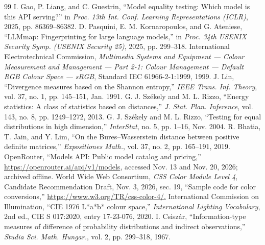 \begin{thebibliography}{99}
 I. Gao, P. Liang, and C. Guestrin, ``Model equality testing: Which model is this API serving?'' in \emph{Proc. 13th Int. Conf. Learning Representations (ICLR)}, 2025, pp. 86369--86382.
 D. Pasquini, E. M. Kornaropoulos, and G. Ateniese, ``LLMmap: Fingerprinting for large language models,'' in \emph{Proc. 34th USENIX Security Symp. (USENIX Security 25)}, 2025, pp. 299--318.
 International Electrotechnical Commission, \emph{Multimedia Systems and Equipment --- Colour Measurement and Management --- Part 2-1: Colour Management --- Default RGB Colour Space --- sRGB}, Standard IEC 61966-2-1:1999, 1999.
 J. Lin, ``Divergence measures based on the Shannon entropy,'' \emph{IEEE Trans. Inf. Theory}, vol. 37, no. 1, pp. 145--151, Jan. 1991.
 G. J. Sz\'{e}kely and M. L. Rizzo, ``Energy statistics: A class of statistics based on distances,'' \emph{J. Stat. Plan. Inference}, vol. 143, no. 8, pp. 1249--1272, 2013.
 G. J. Sz\'{e}kely and M. L. Rizzo, ``Testing for equal distributions in high dimension,'' \emph{InterStat}, no. 5, pp. 1--16, Nov. 2004.
 R. Bhatia, T. Jain, and Y. Lim, ``On the Bures--Wasserstein distance between positive definite matrices,'' \emph{Expositiones Math.}, vol. 37, no. 2, pp. 165--191, 2019.
 OpenRouter, ``Models API: Public model catalog and pricing,'' \url{https://openrouter.ai/api/v1/models}, accessed Nov. 13 and Nov. 20, 2026; archived offline.
 World Wide Web Consortium, \emph{CSS Color Module Level 4}, Candidate Recommendation Draft, Nov. 3, 2026, sec. 19, ``Sample code for color conversions,'' \url{https://www.w3.org/TR/css-color-4/.}
 International Commission on Illumination, ``CIE 1976 L*a*b* colour space,'' \emph{International Lighting Vocabulary}, 2nd ed., CIE S 017:2020, entry 17-23-076, 2020.
 I. Csisz\'{a}r, ``Information-type measures of difference of probability distributions and indirect observations,'' \emph{Studia Sci. Math. Hungar.}, vol. 2, pp. 299--318, 1967.
\end{thebibliography}
